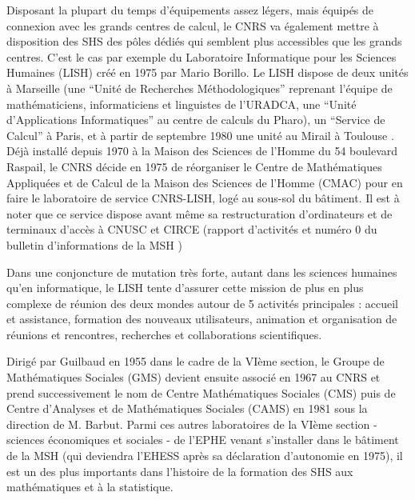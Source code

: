 Disposant la plupart du temps d'équipements assez légers, mais équipés de connexion avec les grands centres de calcul, le CNRS va également mettre à disposition des SHS des pôles dédiés qui semblent plus accessibles que les grands centres. C’est le cas par exemple du Laboratoire Informatique pour les Sciences Humaines (LISH) \autocite{MSH1975} créé en 1975 par Mario Borillo. Le LISH dispose de deux unités à Marseille (une \enquote{Unité de Recherches Méthodologiques} reprenant l'équipe de mathématiciens, informaticiens et linguistes de l'URADCA, une \enquote{Unité d’Applications Informatiques} au centre de calculs du Pharo), un \enquote{Service de Calcul} à Paris, et à partir de septembre 1980 une unité au Mirail à Toulouse \autocites[154]{Mathieu2014}{MSH1975,LISH1981a,LISH1980a,LISH1980b,LISH1981b,LISH1982a,LISH1982b,LISH1984}. Déjà installé depuis 1970 à la Maison des Sciences de l'Homme du 54 boulevard Raspail, le CNRS décide en 1975 de réorganiser le Centre de Mathématiques Appliquées et de Calcul de la Maison des Sciences de l’Homme (CMAC) pour en faire le laboratoire de service CNRS-LISH, logé au sous-sol du bâtiment. Il est à noter que ce service dispose avant même sa restructuration d’ordinateurs et de terminaux d’accès à CNUSC et CIRCE (rapport d’activités \autocite{CNRS1972} et numéro $0$ du bulletin d'informations de la MSH \autocite{MSH1973})

Dans une conjoncture de mutation très forte, autant dans les sciences humaines qu'en informatique, le LISH tente d'assurer cette mission de plus en plus complexe de réunion des deux mondes autour de 5 activités principales : accueil et assistance, formation des nouveaux utilisateurs, animation et organisation de réunions et rencontres, recherches et collaborations scientifiques.


Dirigé par Guilbaud en 1955 dans le cadre de la VIème section, le Groupe de Mathématiques Sociales (GMS) devient ensuite associé en 1967 au CNRS et prend successivement le nom de Centre Mathématiques Sociales (CMS) puis de Centre d’Analyses et de Mathématiques Sociales (CAMS) en 1981 sous la direction de M. Barbut. Parmi ces autres laboratoires de la VIème section - sciences économiques et sociales - de l'EPHE venant s'installer dans le bâtiment de la MSH (qui deviendra l'EHESS après sa déclaration d'autonomie en 1975), il est un des plus importants dans l'histoire de la formation des SHS aux mathématiques et à la statistique.

